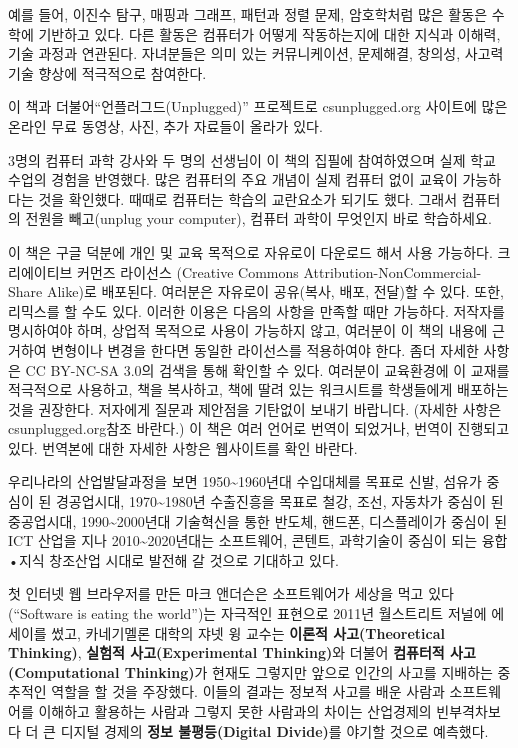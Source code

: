\documentclass[]{article}
\begin{document}
예를 들어, 이진수 탐구, 매핑과 그래프, 패턴과 정렬 문제, 암호학처럼 많은
활동은 수학에 기반하고 있다. 다른 활동은 컴퓨터가 어떻게 작동하는지에
대한 지식과 이해력, 기술 과정과 연관된다. 자녀분들은 의미 있는
커뮤니케이션, 문제해결, 창의성, 사고력 기술 향상에 적극적으로 참여한다.

이 책과 더불어``언플러그드(Unplugged)'' 프로젝트로 csunplugged.org
사이트에 많은 온라인 무료 동영상, 사진, 추가 자료들이 올라가 있다.

3명의 컴퓨터 과학 강사와 두 명의 선생님이 이 책의 집필에 참여하였으며
실제 학교 수업의 경험을 반영했다. 많은 컴퓨터의 주요 개념이 실제 컴퓨터
없이 교육이 가능하다는 것을 확인했다. 때때로 컴퓨터는 학습의 교란요소가
되기도 했다. 그래서 컴퓨터의 전원을 빼고(unplug your computer), 컴퓨터
과학이 무엇인지 바로 학습하세요.

이 책은 구글 덕분에 개인 및 교육 목적으로 자유로이 다운로드 해서 사용
가능하다. 크리에이티브 커먼즈 라이선스 (Creative Commons
Attribution-NonCommercial-Share Alike)로 배포된다. 여러분은 자유로이
공유(복사, 배포, 전달)할 수 있다. 또한, 리믹스를 할 수도 있다. 이러한
이용은 다음의 사항을 만족할 때만 가능하다. 저작자를 명시하여야 하며,
상업적 목적으로 사용이 가능하지 않고, 여러분이 이 책의 내용에 근거하여
변형이나 변경을 한다면 동일한 라이선스를 적용하여야 한다. 좀더 자세한
사항은 CC BY-NC-SA 3.0의 검색을 통해 확인할 수 있다. 여러분이 교육환경에
이 교재를 적극적으로 사용하고, 책을 복사하고, 책에 딸려 있는 워크시트를
학생들에게 배포하는 것을 권장한다. 저자에게 질문과 제안점을 기탄없이
보내기 바랍니다. (자세한 사항은 csunplugged.org참조 바란다.) 이 책은
여러 언어로 번역이 되었거나, 번역이 진행되고 있다. 번역본에 대한 자세한
사항은 웹사이트를 확인 바란다.


우리나라의 산업발달과정을 보면 1950\textasciitilde{}1960년대 수입대체를
목표로 신발, 섬유가 중심이 된 경공업시대, 1970\textasciitilde{}1980년
수출진흥을 목표로 철강, 조선, 자동차가 중심이 된 중공업시대,
1990\textasciitilde{}2000년대 기술혁신을 통한 반도체, 핸드폰,
디스플레이가 중심이 된 ICT 산업을 지나 2010\textasciitilde{}2020년대는
소프트웨어, 콘텐트, 과학기술이 중심이 되는 융합•지식 창조산업 시대로
발전해 갈 것으로 기대하고 있다.

첫 인터넷 웹 브라우저를 만든 마크 앤더슨은 소프트웨어가 세상을 먹고
있다(``Software is eating the world'')는 자극적인 표현으로 2011년
월스트리트 저널에 에세이를 썼고, 카네기멜론 대학의 쟈넷 윙 교수는
\textbf{이론적 사고(Theoretical Thinking)}, \textbf{실험적
사고(Experimental Thinking)}와 더불어 \textbf{컴퓨터적
사고(Computational Thinking)}가 현재도 그렇지만 앞으로 인간의 사고를
지배하는 중추적인 역할을 할 것을 주장했다. 이들의 결과는 정보적 사고를
배운 사람과 소프트웨어를 이해하고 활용하는 사람과 그렇지 못한 사람과의
차이는 산업경제의 빈부격차보다 더 큰 디지털 경제의 \textbf{정보
불평등(Digital Divide)}를 야기할 것으로 예측했다.
\end{document}
